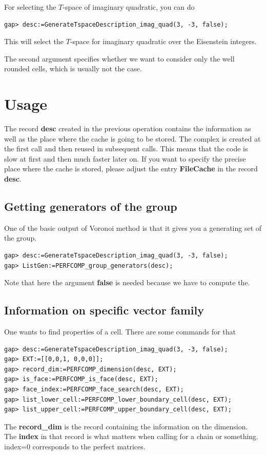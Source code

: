 \documentclass[12pt]{amsart}
\begin{document}
For selecting the $T$-space of imaginary quadratic, you can do
\begin{verbatim}
gap> desc:=GenerateTspaceDescription_imag_quad(3, -3, false);
\end{verbatim}
This will select the $T$-space for imaginary quadratic over the Eisenstein integers.

The second argument specifies whether we want to consider only the well rounded cells, which is usually not the case.



\section{Usage}

The record {\bf desc} created in the previous operation contains the information as well as the place where the cache is going to be stored. The complex is created at the first call and then reused in subsequent calls. This means that the code is slow at first and then much faster later on. If you want to specify the precise place where the cache is stored, please adjust the entry {\bf FileCache} in the record {\bf desc}.


\subsection{Getting generators of the group}

One of the basic output of Voronoi method is that it gives you a generating set of the group.

\begin{verbatim}
gap> desc:=GenerateTspaceDescription_imag_quad(3, -3, false);
gap> ListGen:=PERFCOMP_group_generators(desc);
\end{verbatim}
Note that here the argument {\bf false} is needed because we have to compute the.

\subsection{Information on specific vector family}

One wants to find properties of a cell. There are some commands for that
\begin{verbatim}
gap> desc:=GenerateTspaceDescription_imag_quad(3, -3, false);
gap> EXT:=[[0,0,1, 0,0,0]];
gap> record_dim:=PERFCOMP_dimension(desc, EXT);
gap> is_face:=PERFCOMP_is_face(desc, EXT);
gap> face_index:=PERFCOMP_face_search(desc, EXT);
gap> list_lower_cell:=PERFCOMP_lower_boundary_cell(desc, EXT);
gap> list_upper_cell:=PERFCOMP_upper_boundary_cell(desc, EXT);
\end{verbatim}
The {\bf record\_dim} is the record containing the information on the dimension. The {\bf index} in that record is what matters when calling for a chain or something. index=0 corresponds to the perfect matrices.
\end{document}
